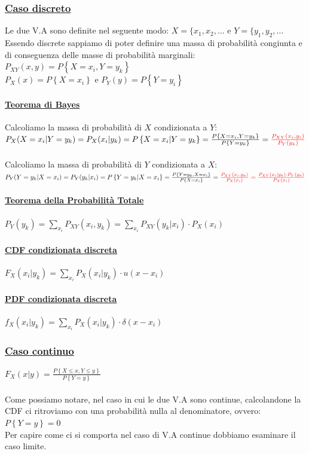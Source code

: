 \documentclass{article}
\begin{document}
\subsubsection{\underline{Caso discreto}}
Le due V.A sono definite nel seguente modo: $X = \{ x_1,x_2, \dots$ e $Y = \{ y_1, y_2, \dots$ \\
Essendo discrete sappiamo di poter definire una massa di probabilità congiunta e di conseguenza delle masse di probabilità marginali: \\
$P_{XY}(x,y) = P \left\{X = x_i, Y=y_k\right\}$ \\
$P_X(x) = P\left\{X = x_i\right\}$ e $P_Y(y) = P\left\{Y = y_i\right\}$\\
\paragraph{\underline{Teorema di Bayes}}
Calcoliamo la massa di probabilità di $X$ condizionata a $Y$: \\
$P_X(X = x_i |Y=y_k) = P_X(x_i|y_k) = P \left\{X = x_i | Y = y_k \right\} = \frac{P \left\{X=x_i,Y=y_k\right\}}{P\left\{  Y = y_k\right\}} = 
\color{red} \frac{P_{XY}(x_i,y_i) }{P_Y (y_k)}$ \\ \\
Calcoliamo la massa di probabilità di $Y$ condizionata a $X$: \\
$P_Y(Y = y_k |X = x_i) = P_Y(y_k|x_i) = P \left\{ Y = y_k | X = x_i\right\} = \frac{P \left\{Y=y_k, X=x_i\right\}}{P\left\{  X = x_i\right\}} = 
\color{red} \frac{P_{XY}(x_i,y_k) }{P_X (x_i)} = \color{red} \frac{P_{XY}(x_i|y_k) \cdot P_Y(y_k)}{P_X (x_i)}$
\paragraph{\underline{Teorema della Probabilità Totale}}
$P_Y(y_k) = \sum_{x_i} P_{XY}(x_i,y_k) = \sum_{x_i} P_{XY}(y_k|x_i) \cdot P_X(x_i)$
\paragraph{\underline{CDF condizionata discreta}}
$F_X(x_i|y_k) = \sum_{x_i} P_X(x_i|y_k) \cdot u(x-x_i)$
\paragraph{\underline{PDF condizionata discreta}}
$f_X(x_i|y_k) = \sum_{x_i} P_X(x_i|y_k) \cdot \delta(x-x_i)$
\subsubsection{\underline{Caso continuo}}
$F_X(x|y) = \frac{P\left\{ X \leq x, Y \leq y \right\}}{P\left\{ Y = y\right\}}$ \\ \\
Come possiamo notare, nel caso in cui le due V.A sono continue, calcolandone la CDF ci ritroviamo con una probabilità nulla al denominatore, ovvero: $P\left\{ Y = y\right\} = 0$ \\ 
Per capire come ci si comporta nel caso di V.A continue dobbiamo esaminare il caso limite. 
\end{document}
